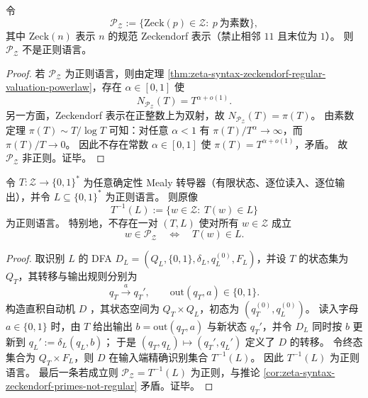 \begin{corollary}\label{cor:zeta-syntax-zeckendorf-primes-not-regular}
令
\[
\mathcal P_{\mathcal Z}:=\{\mathrm{Zeck}(p)\in\mathcal Z:\ p\ \text{为素数}\},
\]
其中 \(\mathrm{Zeck}(n)\) 表示 \(n\) 的规范 Zeckendorf 表示（禁止相邻 \(11\) 且末位为 \(1\)）。
则 \(\mathcal P_{\mathcal Z}\) 不是正则语言。
\end{corollary}
\begin{proof}
若 \(\mathcal P_{\mathcal Z}\) 为正则语言，则由定理 \ref{thm:zeta-syntax-zeckendorf-regular-valuation-powerlaw}，存在 \(\alpha\in[0,1]\) 使
\[
N_{\mathcal P_{\mathcal Z}}(T)=T^{\alpha+o(1)}.
\]
另一方面，Zeckendorf 表示在正整数上为双射，故 \(N_{\mathcal P_{\mathcal Z}}(T)=\pi(T)\)。
由素数定理 \(\pi(T)\sim T/\log T\) 可知：对任意 \(\alpha<1\) 有 \(\pi(T)/T^\alpha\to\infty\)，而 \(\pi(T)/T\to 0\)。
因此不存在常数 \(\alpha\in[0,1]\) 使 \(\pi(T)=T^{\alpha+o(1)}\)，矛盾。
故 \(\mathcal P_{\mathcal Z}\) 非正则。证毕。
\end{proof}

\begin{corollary}\label{cor:zeta-syntax-zeckendorf-primes-mealy-regular-impossible}
令 \(T:\mathcal Z\to\{0,1\}^\ast\) 为任意确定性 Mealy 转导器（有限状态、逐位读入、逐位输出），并令 \(L\subseteq\{0,1\}^\ast\) 为正则语言。
则原像
\[
T^{-1}(L):=\{w\in\mathcal Z:\ T(w)\in L\}
\]
为正则语言。
特别地，不存在一对 \((T,L)\) 使对所有 \(w\in\mathcal Z\) 成立
\[
w\in\mathcal P_{\mathcal Z}\quad\Longleftrightarrow\quad T(w)\in L.
\]
\end{corollary}
\begin{proof}
取识别 \(L\) 的 DFA \(D_L=(Q_L,\{0,1\},\delta_L,q_L^{(0)},F_L)\)，并设 \(T\) 的状态集为 \(Q_T\)，其转移与输出规则分别为
\[
q_T\xrightarrow{a}q_T',\qquad \mathrm{out}(q_T,a)\in\{0,1\}.
\]
构造直积自动机 \(D\) ，其状态空间为 \(Q_T\times Q_L\)，初态为 \((q_T^{(0)},q_L^{(0)})\)。
读入字母 \(a\in\{0,1\}\) 时，由 \(T\) 给出输出 \(b=\mathrm{out}(q_T,a)\) 与新状态 \(q_T'\)，并令 \(D_L\) 同时按 \(b\) 更新到 \(q_L':=\delta_L(q_L,b)\)；
于是 \((q_T,q_L)\mapsto(q_T',q_L')\) 定义了 \(D\) 的转移。
令终态集合为 \(Q_T\times F_L\)，则 \(D\) 在输入端精确识别集合 \(T^{-1}(L)\)。
因此 \(T^{-1}(L)\) 为正则语言。
最后一条若成立则 \(\mathcal P_{\mathcal Z}=T^{-1}(L)\) 为正则，与推论 \ref{cor:zeta-syntax-zeckendorf-primes-not-regular} 矛盾。证毕。
\end{proof}

